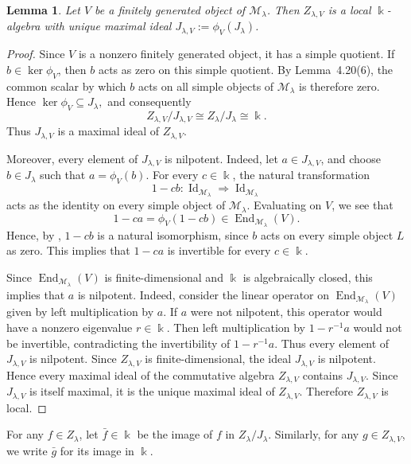 \documentclass[a4,10pt]{amsart}
\numberwithin{equation}{section}
\newtheorem{Lemma}[Theorem]{Lemma}
\theoremstyle{definition}
\begin{document}
\begin{Lemma} \label{zlam-loc} Let \(V\) be a finitely generated object of \(\mathcal M_\lambda\). Then  $Z_{\lambda,V}$ is a local $\Bbbk$-algebra with unique
maximal ideal $J_{\lambda,V}:= \phi_V(J_\lambda)$.\end{Lemma} 
\begin{proof} 
Since $V$ is a nonzero finitely generated object, it has a simple
quotient. If $b\in\ker\phi_V$, then $b$ acts as zero on this simple
quotient. By Lemma~4.20(6), the common scalar by which $b$ acts on all
simple objects of $\mathcal M_\lambda$ is therefore zero. Hence
\(
\ker\phi_V\subseteq J_\lambda,
\)
and consequently
\[
Z_{\lambda,V}/J_{\lambda,V}
\cong Z_\lambda/J_\lambda
\cong\Bbbk.
\]
Thus $J_{\lambda,V}$ is a maximal ideal of $Z_{\lambda,V}$.

Moreover, every element of $J_{\lambda,V}$ is nilpotent. Indeed, let
$a\in J_{\lambda,V}$, and choose $b\in J_\lambda$ such that
$a=\phi_V(b)$. For every $c\in\Bbbk$, the natural transformation
\[
1-cb:\operatorname{Id}_{\mathcal M_\lambda}
\Longrightarrow \operatorname{Id}_{\mathcal M_\lambda}
\]
acts as the identity on every simple object of $\mathcal M_\lambda$.
Evaluating on $V$, we see that
\[
1-ca=\phi_V(1-cb) \in\operatorname{End}_{\mathcal M_\lambda}(V).
\]
Hence, by \cite[Lemma~2.12]{BD-cate}, $1-cb$ is a natural isomorphism, since $b$ acts on every simple object $L$ as zero. This implies that $1-ca$ is invertible for every $c\in\Bbbk$.

Since $\operatorname{End}_{\mathcal M_\lambda}(V)$ is finite-dimensional
and $\Bbbk$ is algebraically closed, this implies that $a$ is
nilpotent. Indeed, consider the linear operator on
$\operatorname{End}_{\mathcal M_\lambda}(V)$ given by left
multiplication by $a$. If $a$ were not nilpotent, this operator would
have a nonzero eigenvalue $r\in\Bbbk$. Then left multiplication by
$1-r^{-1}a$ would not be invertible, contradicting the invertibility
of $1-r^{-1}a$. Thus every element of $J_{\lambda,V}$ is nilpotent.
Since $Z_{\lambda, V}$ is finite-dimensional, the ideal $J_{\lambda, V}$  is nilpotent. 
Hence every
maximal ideal of the commutative algebra $Z_{\lambda,V}$ contains
$J_{\lambda,V}$. Since $J_{\lambda,V}$ is itself maximal, it is the
unique maximal ideal of $Z_{\lambda,V}$. Therefore
$Z_{\lambda,V}$ is local.
\end{proof}


For any $f\in Z_{\lambda}$, let $\bar f\in \Bbbk$ be the image of $f$ in $Z_\lambda/ J_\lambda$. Similarly, for any $g\in Z_{\lambda, V}$,  we write $\bar g$ for its image  in $\Bbbk$. 
\end{document}
